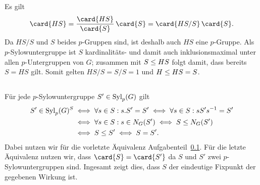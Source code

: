 \subsection{}
\label{subsection: contained in Sylow subgroup}

Es gilt
\[
    \card{HS}
  = \frac{\card{HS}}{\card{S}} \, \card{S}
  = \card{HS/S} \, \card{S}.
\]
Da $HS/S$ und $S$ beides $p$-Gruppen sind, ist deshalb auch $HS$ eine $p$-Gruppe.
Als $p$-Sylowuntergruppe ist $S$ kardinalitäts- und damit auch inklusionsmaximal unter allen $p$-Untergruppen von $G$;
zusammen mit $S \subgroup HS$ folgt damit, dass bereits $S = HS$ gilt.
Somit gelten $HS/S = S/S = 1$ und $H \subgroup HS = S$.





\subsection{}
\label{subsection: unique fixed point}

Für jede $p$-Sylowuntergruppe $S' \in \Sylow{p}{G}$ gilt
\begin{align*}
        S' \in \Sylow{p}{G}^S
  &\iff \forall s \in S: s.S' = S'
   \iff \forall s \in S: s S' s^{-1} = S'
  \\
  &\iff \forall s \in S: s \in \normalizer{S'}{G}
   \iff S \subgroup \normalizer{S'}{G}
  \\
  &\iff S \subgroup S'
   \iff S = S'.
\end{align*}
Dabei nutzen wir für die vorletzte Äquivalenz Aufgabenteil~\ref{subsection: contained in Sylow subgroup}.
Für die letzte Äquivalenz nutzen wir, dass $\card{S} = \card{S'}$ da $S$ und $S'$ zwei $p$-Sylowuntergruppen sind.
Ingesamt zeigt dies, dass $S$ der eindeutige Fixpunkt der gegebenen Wirkung ist.





\subsection{}


